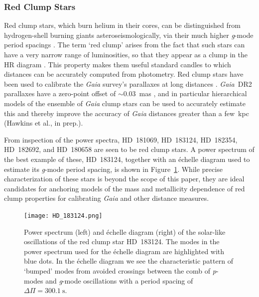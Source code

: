 \documentclass[a4paper,fleqn,usenatbib]{mnras}
\newcommand{\gaia}{\emph{Gaia}\xspace}
\begin{document}



\subsubsection{Red Clump Stars}
\label{clumpstars}

Red clump stars, which burn helium in their cores, can be distinguished from hydrogen-shell burning giants asteroseismologically, via their much higher \emph{g}-mode period spacings \citep{rggmodehelium}. 
The term `red clump' arises from the fact that such stars can have a very narrow range of luminosities, so that they appear as a clump in the HR diagram \citep{2016ARA&A..54...95G}. This property makes them useful standard candles to which distances can be accurately computed from photometry. Red clump stars have been used to calibrate the \gaia survey's parallaxes at long distances \citep{2017A&A...598L...4D,2017MNRAS.471..722H,2018A&A...609A.116R}. \gaia~DR2 parallaxes have a zero-point offset of $\sim 0.03$~mas \citep{gaiadr2parallax}, and in particular hierarchical models of the ensemble of \gaia clump stars can be used to accurately estimate this and thereby improve the accuracy of \gaia distances greater than a few~kpc (Hawkins et al., in prep.).

From inspection of the power spectra, HD~181069, HD~183124, HD~182354, HD~182692, and HD~180658 are seen to be red clump stars. A power spectrum of the best example of these, HD~183124, together with an \'{e}chelle diagram used to estimate its \emph{g}-mode period spacing, is shown in Figure~\ref{HD_183124}. While precise characterization of these stars is beyond the scope of this paper, they are ideal candidates for anchoring models of the mass and metallicity dependence of red clump properties for calibrating \gaia and other distance measures. 

\begin{figure}
\noindent\texttt{[image: HD\_183124.png]}

\caption{\label{HD_183124}
Power spectrum (left) and \'{e}chelle diagram (right) of the solar-like oscillations of the red clump star HD~183124. The modes in the power spectrum used for the \'{e}chelle diagram are highlighted with blue dots. In the \'{e}chelle diagram we see the characteristic pattern of `bumped' modes from avoided crossings between the comb of \emph{p}-modes and \emph{g}-mode oscillations with a period spacing of $\Delta \Pi = 300.1~\text{s}$.}
\end{figure}
\end{document}
